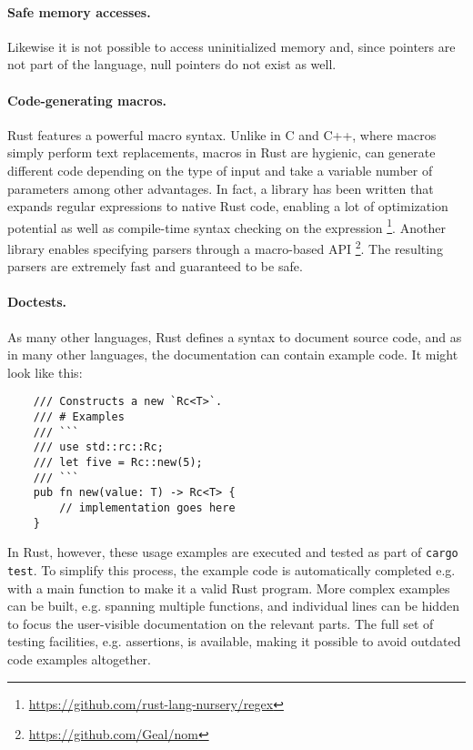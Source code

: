 \documentclass{scrartcl}
\begin{document}
\paragraph{Safe memory accesses.} Likewise it is not possible to access uninitialized memory and, since pointers are not part of the language, null pointers do not exist as well.

\paragraph{Code-generating macros.} Rust features a powerful macro syntax. Unlike in C and C++, where macros simply perform text replacements, macros in Rust are hygienic, can generate different code depending on the type of input and take a variable number of parameters among other advantages. In fact, a library has been written that expands regular expressions to native Rust code, enabling a lot of optimization potential as well as compile-time syntax checking on the expression \footnote{\url{https://github.com/rust-lang-nursery/regex}}. Another library enables specifying parsers through a macro-based API \footnote{\url{https://github.com/Geal/nom}}. The resulting parsers are extremely fast and guaranteed to be safe.

\paragraph{Doctests.} As many other languages, Rust defines a syntax to document source code, and as in many other languages, the documentation can contain example code. It might look like this:

\small {
    \begin{verbatim}
    /// Constructs a new `Rc<T>`.
    /// # Examples
    /// ```
    /// use std::rc::Rc;
    /// let five = Rc::new(5);
    /// ```
    pub fn new(value: T) -> Rc<T> {
        // implementation goes here
    }
    \end{verbatim}
}

In Rust, however, these usage examples are executed and tested as part of \texttt{cargo test}. To simplify this process, the example code is automatically completed e.g. with a main function to make it a valid Rust program. More complex examples can be built, e.g. spanning multiple functions, and individual lines can be hidden to focus the user-visible documentation on the relevant parts. The full set of testing facilities, e.g. assertions, is available, making it possible to avoid outdated code examples altogether.
\end{document}
